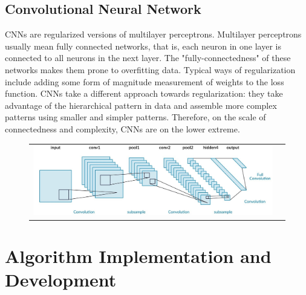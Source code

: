 \documentclass[12pt]{article}
\begin{document}
\subsection{Convolutional Neural Network}
CNNs are regularized versions of multilayer perceptrons. Multilayer perceptrons usually mean fully connected networks, that is, each neuron in one layer is connected to all neurons in the next layer. The "fully-connectedness" of these networks makes them prone to overfitting data. Typical ways of regularization include adding some form of magnitude measurement of weights to the loss function. CNNs take a different approach towards regularization: they take advantage of the hierarchical pattern in data and assemble more complex patterns using smaller and simpler patterns. Therefore, on the scale of connectedness and complexity, CNNs are on the lower extreme.
\begin{figure}[H]
\begin{tabular}{cc}
  \includegraphics[width=\textwidth]{cnn.jpg}
\end{tabular}
\end{figure}

\section{Algorithm Implementation and Development}
\end{document}
